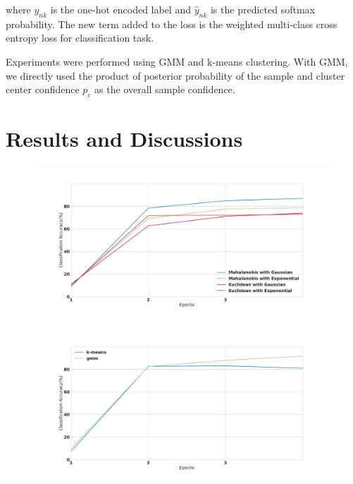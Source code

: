 \documentclass[runningheads]{llncs}
\begin{document}
where $y_{nk}$ is the one-hot encoded label and $\hat{y}_{nk}$ is the predicted softmax probability.
The new term added to the loss is the weighted multi-class cross entropy loss for classification task.


Experiments were performed  using GMM and k-means clustering.
With GMM, we directly used the product of posterior probability of the sample and cluster center confidence $p_c$ as the overall sample confidence.


\section{Results and Discussions}
\begin{figure}
\centering
\begin{minipage}{.5\textwidth}
  \centering
  \includegraphics[width=.9\linewidth]{classification_accuracy_hyperparameter}
  \label{classification_acc_hyper_parameter}
\end{minipage}%
\begin{minipage}{.5\textwidth}
  \centering
  \includegraphics[width=.9\linewidth]{classification_accuracy_kmeans_gmm}
  \label{classification_acc_kmeans_gmm}
\end{minipage}
\end{figure}
\end{document}
